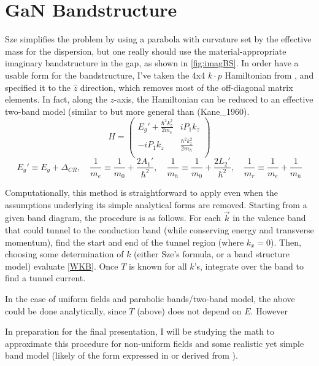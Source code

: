 \section{GaN Bandstructure}
Sze simplifies the problem by using a parabola with curvature set by the effective mass for the dispersion, but one really should use the material-appropriate imaginary bandstructure in the gap, as shown in \ref{fig:imagBS}.  In order have a usable form for the bandstructure, I've taken the 4x4 $k\cdot p$ Hamiltonian from \cite{Rinke_2008}, and specified it to the $\hat{z}$ direction, which removes most of the off-diagonal matrix elements.  In fact, along the $z$-axis, the Hamiltonian can be reduced to an effective two-band model (similar to but more general than (Kane_1960).
\[
  H=\begin{pmatrix}
    E_g'+\frac{\hbar^2k_z^2}{2m_e} & iP_1k_z\\
    -iP_1k_z & \frac{\hbar^2k_z^2}{2m_h} \\
  \end{pmatrix}
\]
\[
  E_g'\equiv E_g+\Delta_{CR}, \quad \frac{1}{m_e}\equiv\frac{1}{m_0}+\frac{2A_1'}{\hbar^2}, \quad \frac{1}{m_h}\equiv\frac{1}{m_0}+\frac{2L_2'}{\hbar^2}, \quad
\frac{1}{m_r}\equiv\frac{1}{m_e}+\frac{1}{m_h}
\]




Computationally, this method is straightforward to apply even when the assumptions underlying its simple analytical forms are removed.  Starting from a given band diagram, the procedure is as follows.  For each $\vec{k}$ in the valence band that could tunnel to the conduction band (while conserving energy and transverse momentum), find the start and end of the tunnel region (where $k_x=0$).  Then, choosing some determination of $k$ (either Sze's formula, or a band structure model) evaluate \ref{WKB}.  Once $T$ is known for all $k$'s, integrate over the band to find a tunnel current.



In the case of uniform fields and parabolic bands/two-band model, the above could be done analytically, since $T$ (above) does not depend on $E$.  However


In preparation for the final presentation, I will be studying the math to approximate this procedure for non-uniform fields and some realistic yet simple band model (likely of the form expressed in \cite{Guan_2011} or derived from \cite{Piprek}).